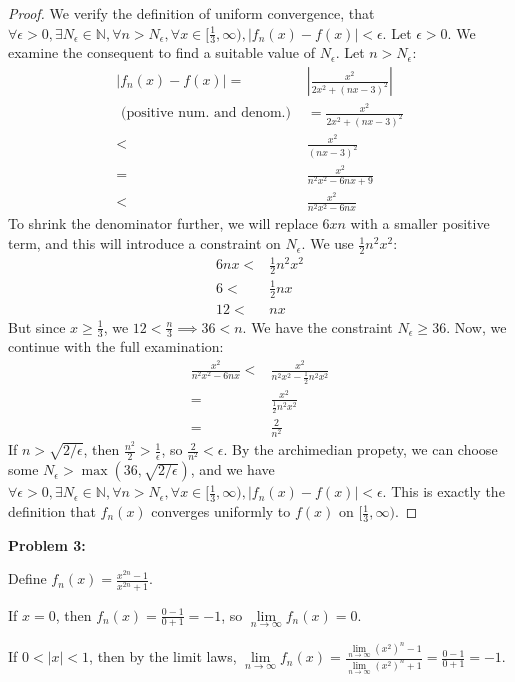 \documentclass{article}
\newcommand{\nats}{\ensuremath{\mathbb{N}}}
\newcommand{\eps}{\ensuremath{\epsilon}}
\newcommand{\limxy}[2]{\ensuremath{\underset{#1 \to #2 }{\lim}}}
\newcommand{\pt}[1]{\textrm{ #1 }}
\begin{document}
\begin{proof}
	We verify the definition of uniform convergence, that
	$\forall \eps > 0,
	\exists N_\eps \in \nats,
	\forall n > N_\eps,
	\forall x \in [\frac{1}{3}, \infty),
	|f_n(x) - f(x)| < \eps$.
	Let $\eps > 0$.
	We examine the consequent to find a suitable value of $N_\eps$.
	Let $n > N_\eps$:
	\begin{align}
		|f_n(x) - f(x)| = & |\frac{x^2}{2x^2 + (nx - 3)^2}| \\
		\pt{(positive num. and denom.)} & = \frac{x^2}{2x^2 + (nx - 3)^2} \\
				< &  \frac{x^2}{(nx - 3)^2} \\
				= & \frac{x^2}{n^2x^2 -6nx + 9} \\
				< & \frac{x^2}{n^2x^2 -6nx}
	\end{align}
	To shrink the denominator further,
	we will replace $6xn$ with a smaller positive term,
	and this will introduce a constraint on $N_\eps$.
	We  use $\frac{1}{2}n^2x^2$:
	\begin{align}
		6nx < & \frac{1}{2}n^2 x^2 \\
		6 < & \frac{1}{2}nx \\
		12 < & nx
	\end{align}
	But since $x \geq \frac{1}{3}$,
	we $12 < \frac{n}{3} \implies 36 < n$.
	We have the constraint $N_\eps \geq 36$.
	Now, we continue with the full examination:
	\begin{align}
		\frac{x^2}{n^2x^2 -6nx} < & \frac{x^2}{n^2x^2 -\frac{1}{2}n^2x^2} \\
					= & \frac{x^2}{\frac{1}{2}n^2x^2} \\
					= & \frac{2}{n^2}
	\end{align}
	If $n > \sqrt{2/\eps}$,
	then $\frac{n^2}{2} > \frac{1}{\eps}$,
	so $\frac{2}{n^2} < \eps$.
	By the archimedian propety,
	we can choose some $N_\eps > \max(36, \sqrt{2/\eps})$,
	and we have
	$\forall \eps > 0,
	\exists N_\eps \in \nats,
	\forall n > N_\eps,
	\forall x \in [\frac{1}{3}, \infty),
	|f_n(x) - f(x)| < \eps$.
	This is exactly the definition that
	$f_n(x)$ converges uniformly to $f(x)$ on $[\frac{1}{3}, \infty)$.
\end{proof}

\textbf{Problem 3:}

Define $f_n(x) = \frac{x^{2n} - 1}{x^{2n} + 1}$.

If $x = 0$, then  $f_n(x) = \frac{0- 1}{0 + 1} = -1$, so $\limxy{n}{\infty} f_n(x) = 0$.

If $0 < |x| < 1$, then by the limit laws,
$\limxy{n}{\infty} f_n(x) = \frac{\limxy{n}{\infty} (x^2)^n - 1}{\limxy{n}{\infty} (x^2)^n + 1}
= \frac{0- 1}{0 + 1} = -1$.
\end{document}

